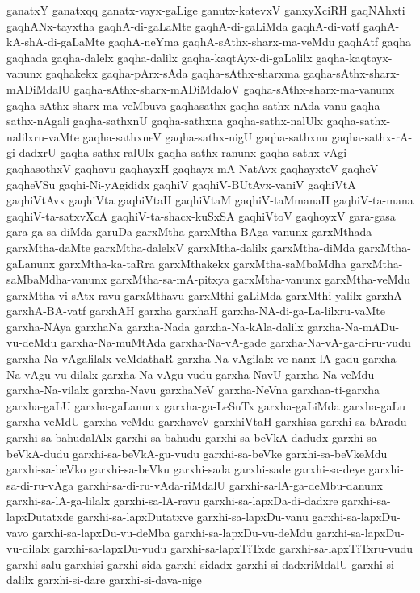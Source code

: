 {ganatxY
ganatxqq
ganatx-vayx-gaLige
ganutx-katevxV
ganxyXciRH
gaqNAhxti
gaqhANx-tayxtha
gaqhA-di-gaLaMte
gaqhA-di-gaLiMda
gaqhA-di-vatf
gaqhA-kA-shA-di-gaLaMte
gaqhA-neYma
gaqhA-sAthx-sharx-ma-veMdu
gaqhAtf
gaqha
gaqhada
gaqha-dalelx
gaqha-dalilx
gaqha-kaqtAyx-di-gaLalilx
gaqha-kaqtayx-vanunx
gaqhakekx
gaqha-pArx-sAda
gaqha-sAthx-sharxma
gaqha-sAthx-sharx-mADiMdalU
gaqha-sAthx-sharx-mADiMdaloV
gaqha-sAthx-sharx-ma-vanunx
gaqha-sAthx-sharx-ma-veMbuva
gaqhasathx
gaqha-sathx-nAda-vanu
gaqha-sathx-nAgali
gaqha-sathxnU
gaqha-sathxna
gaqha-sathx-nalUlx
gaqha-sathx-nalilxru-vaMte
gaqha-sathxneV
gaqha-sathx-nigU
gaqha-sathxnu
gaqha-sathx-rA-gi-dadxrU
gaqha-sathx-ralUlx
gaqha-sathx-ranunx
gaqha-sathx-vAgi
gaqhasothxV
gaqhavu
gaqhayxH
gaqhayx-mA-NatAvx
gaqhayxteV
gaqheV
gaqheVSu
gaqhi-Ni-yAgididx
gaqhiV
gaqhiV-BUtAvx-vaniV
gaqhiVtA
gaqhiVtAvx
gaqhiVta
gaqhiVtaH
gaqhiVtaM
gaqhiV-taMmanaH
gaqhiV-ta-mana
gaqhiV-ta-satxvXcA
gaqhiV-ta-shacx-kuSxSA
gaqhiVtoV
gaqhoyxV
gara-gasa
gara-ga-sa-diMda
garuDa
garxMtha
garxMtha-BAga-vanunx
garxMthada
garxMtha-daMte
garxMtha-dalelxV
garxMtha-dalilx
garxMtha-diMda
garxMtha-gaLanunx
garxMtha-ka-taRra
garxMthakekx
garxMtha-saMbaMdha
garxMtha-saMbaMdha-vanunx
garxMtha-sa-mA-pitxya
garxMtha-vanunx
garxMtha-veMdu
garxMtha-vi-sAtx-ravu
garxMthavu
garxMthi-gaLiMda
garxMthi-yalilx
garxhA
garxhA-BA-vatf
garxhAH
garxha
garxhaH
garxha-NA-di-ga-La-lilxru-vaMte
garxha-NAya
garxhaNa
garxha-Nada
garxha-Na-kAla-dalilx
garxha-Na-mADu-vu-deMdu
garxha-Na-muMtAda
garxha-Na-vA-gade
garxha-Na-vA-ga-di-ru-vudu
garxha-Na-vAgalilalx-veMdathaR
garxha-Na-vAgilalx-ve-nanx-lA-gadu
garxha-Na-vAgu-vu-dilalx
garxha-Na-vAgu-vudu
garxha-NavU
garxha-Na-veMdu
garxha-Na-vilalx
garxha-Navu
garxhaNeV
garxha-NeVna
garxhaa-ti-garxha
garxha-gaLU
garxha-gaLanunx
garxha-ga-LeSuTx
garxha-gaLiMda
garxha-gaLu
garxha-veMdU
garxha-veMdu
garxhaveV
garxhiVtaH
garxhisa
garxhi-sa-bAradu
garxhi-sa-bahudalAlx
garxhi-sa-bahudu
garxhi-sa-beVkA-dadudx
garxhi-sa-beVkA-dudu
garxhi-sa-beVkA-gu-vudu
garxhi-sa-beVke
garxhi-sa-beVkeMdu
garxhi-sa-beVko
garxhi-sa-beVku
garxhi-sada
garxhi-sade
garxhi-sa-deye
garxhi-sa-di-ru-vAga
garxhi-sa-di-ru-vAda-riMdalU
garxhi-sa-lA-ga-deMbu-danunx
garxhi-sa-lA-ga-lilalx
garxhi-sa-lA-ravu
garxhi-sa-lapxDa-di-dadxre
garxhi-sa-lapxDutatxde
garxhi-sa-lapxDutatxve
garxhi-sa-lapxDu-vanu
garxhi-sa-lapxDu-vavo
garxhi-sa-lapxDu-vu-deMba
garxhi-sa-lapxDu-vu-deMdu
garxhi-sa-lapxDu-vu-dilalx
garxhi-sa-lapxDu-vudu
garxhi-sa-lapxTiTxde
garxhi-sa-lapxTiTxru-vudu
garxhi-salu
garxhisi
garxhi-sida
garxhi-sidadx
garxhi-si-dadxriMdalU
garxhi-si-dalilx
garxhi-si-dare
garxhi-si-dava-nige
}
